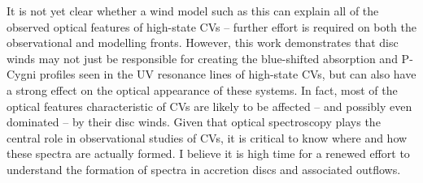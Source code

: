 It is not yet clear whether a wind model such as this can
explain all of the observed optical features of high-state CVs --
further effort is required on both the observational
and modelling fronts. However, this work demonstrates that disc winds may
not just be responsible for creating the blue-shifted absorption and
P-Cygni profiles seen in the UV resonance lines of high-state CVs, but
can also have a strong effect on the optical appearance of these
systems. In fact, most of the optical features characteristic of CVs
are likely to be affected -- and possibly even dominated -- by their disc
winds. Given that optical spectroscopy plays the central role in
observational studies of CVs, it is critical to know 
where and how these spectra are actually formed. I believe it is high
time for a renewed effort to understand the formation of spectra in
accretion discs and associated outflows. 


